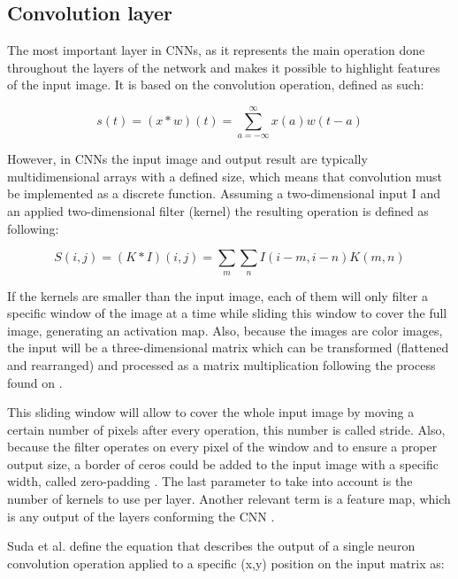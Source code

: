 \subsection{Convolution layer}

The most important layer in CNNs, as it represents the main operation done throughout the layers 
of the network and makes it possible to highlight features of the input image.
It is based on the convolution operation, defined as such:

\begin{equation} \label{eq:convorig}
  s(t)
  =
  (x*w)(t)
  =
  \sum_{a=-\infty}^{\infty} x(a)w(t-a)
\end{equation}

However, in CNNs the input image and output result are typically multidimensional
arrays with a defined size, which means that convolution must be implemented
as a discrete function. Assuming a two-dimensional input I and an applied two-dimensional filter (kernel)
the resulting operation is defined as following:

\begin{equation} \label{eq:convdiscr}
  S(i,j)
  =
  (K*I)(i,j)
  =
  \sum_{m}\sum_{n} I(i-m,i-n)K(m,n)
\end{equation}

If the kernels are smaller than the input image, each of them will only filter a 
specific window of the image at a time
while sliding this window to cover the full image, generating an activation map. 
Also, because the images are color images,
the input will be a three-dimensional matrix which can be transformed (flattened 
and rearranged) and processed as a matrix multiplication
following the process found on \cite{suda}.

This sliding window will allow to cover the whole input image by moving a certain number of pixels after every operation, this number is called stride.
Also, because the filter operates on every pixel of the window and to ensure a proper output size, a border of ceros could be added to the input
image with a specific width, called zero-padding \cite{karpathy2016cs231n}. The last parameter to take into account is the number of kernels to use per layer.
Another relevant term is a feature map, which is any output of the layers conforming the CNN \cite{Goodfellow-et-al-2016}.

Suda et al. define the equation that describes the output of a single neuron convolution operation applied to a specific (x,y) position on 
the input matrix as:

